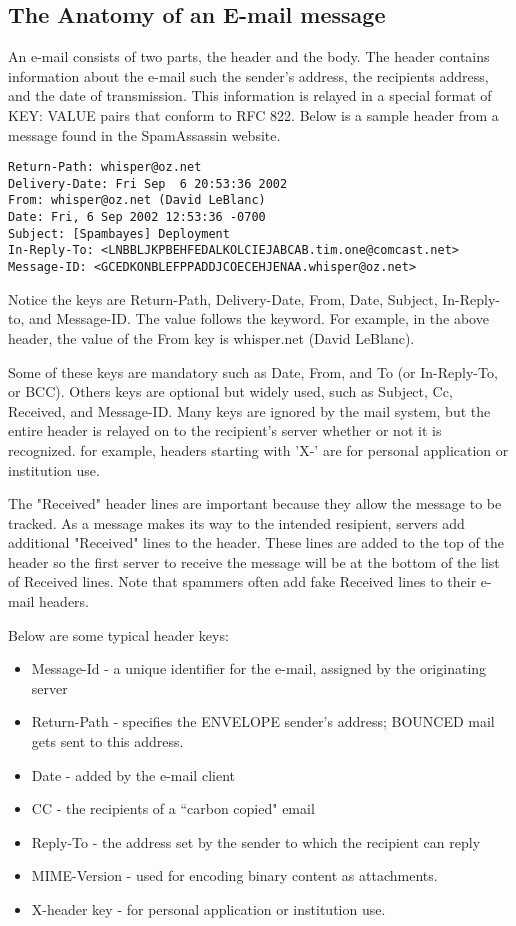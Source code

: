 \documentclass[12pt]{article}
\begin{document}
\subsection*{The Anatomy of an E-mail message}

An e-mail consists of two parts, the header and the body.
The header contains information about the e-mail such
the sender's address, the recipients address, and the date of 
transmission.
This information is relayed in a special format 
of KEY: VALUE pairs that conform to RFC 822.
Below is a sample header from a message found in the
SpamAssassin website.

\begin{verbatim}
Return-Path: whisper@oz.net
Delivery-Date: Fri Sep  6 20:53:36 2002
From: whisper@oz.net (David LeBlanc)
Date: Fri, 6 Sep 2002 12:53:36 -0700
Subject: [Spambayes] Deployment
In-Reply-To: <LNBBLJKPBEHFEDALKOLCIEJABCAB.tim.one@comcast.net>
Message-ID: <GCEDKONBLEFPPADDJCOECEHJENAA.whisper@oz.net>
\end{verbatim}
                                                                               
Notice the keys are Return-Path, Delivery-Date, From, Date,
Subject, In-Reply-to, and Message-ID. 
The value follows the keyword.
For example, in the above header, the value of the From key 
is whisper\@oz.net (David LeBlanc).

Some of these keys are mandatory such as Date, From, and To (or 
In-Reply-To, or BCC).
Others keys are optional but widely used, such as Subject, Cc, 
Received, and Message-ID.
Many keys are ignored by the mail system, but the entire header 
is relayed on to the recipient's server whether or not it is 
recognized. 
for example, headers starting with 'X-' are for personal application 
or institution use.

The "Received" header lines are important because they allow
the message to be tracked. As a message makes its way to the
intended resipient, servers add additional "Received" lines
to the header. 
These lines are added to the top of the header so  the 
first server to receive the message will be at the bottom
of the list of Received lines.
Note that spammers often add fake Received lines to their
e-mail headers.

Below are some typical header keys:

\begin{itemize}
\item Message-Id - a unique identifier for the e-mail, assigned by the 
originating server 
\item Return-Path - specifies the ENVELOPE sender's address; 
         BOUNCED mail gets sent to this address.
\item Date - added by the e-mail client
\item CC - the recipients of a ``carbon copied" email
\item Reply-To - the address set by the sender to which the 
recipient can reply 
\item MIME-Version - used for encoding binary content as attachments.
\item X-header key - for personal application or institution use. 
\end{itemize}
\end{document}
